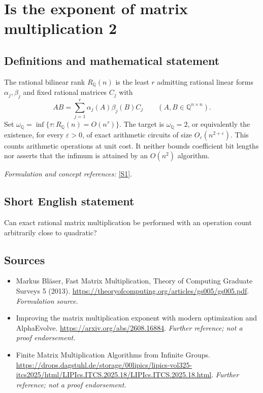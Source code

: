 \documentclass[11pt]{article}
\begin{document}
\section*{\texorpdfstring{Is the exponent of matrix multiplication 2}{Is the exponent of matrix multiplication 2}}\label{statement}
\subsection{Definitions and mathematical statement}
The rational bilinear rank $R_{{\mathbb{Q}}}(n)$ is the least $r$ admitting rational linear forms $\alpha_j,\beta_j$ and fixed rational matrices $C_j$ with
\[
 AB=\sum_{j=1}^r\alpha_j(A)\beta_j(B)C_j\qquad(A,B\in{\mathbb{Q}}^{n\times n}).
\]
Set $\omega_{{\mathbb{Q}}}=\inf\{\tau:R_{{\mathbb{Q}}}(n)=O(n^\tau)\}$. The target is $\omega_{{\mathbb{Q}}}=2$, or equivalently the existence, for every $\varepsilon>0$, of exact arithmetic circuits of size $O_\varepsilon(n^{2+\varepsilon})$. This counts arithmetic operations at unit cost. It neither bounds coefficient bit lengths nor asserts that the infimum is attained by an $O(n^2)$ algorithm.
\par\smallskip\textit{Formulation and concept references:} \href{https://theoryofcomputing.org/articles/gs005/gs005.pdf}{[S1]}.

\subsection{Short English statement}
Can exact rational matrix multiplication be performed with an operation count arbitrarily close to quadratic?
\subsection{Sources}
\begin{itemize}
\item[S1]Markus Bläser, Fast Matrix Multiplication, Theory of Computing Graduate Surveys 5 (2013).
\url{https://theoryofcomputing.org/articles/gs005/gs005.pdf}.
\textit{Formulation source.}
\item[S2]Improving the matrix multiplication exponent with modern optimization and AlphaEvolve.
\url{https://arxiv.org/abs/2608.16884}.
\textit{Further reference; not a proof endorsement.}
\item[S3]Finite Matrix Multiplication Algorithms from Infinite Groups.
\url{https://drops.dagstuhl.de/storage/00lipics/lipics-vol325-itcs2025/html/LIPIcs.ITCS.2025.18/LIPIcs.ITCS.2025.18.html}.
\textit{Further reference; not a proof endorsement.}
\end{itemize}
\end{document}
